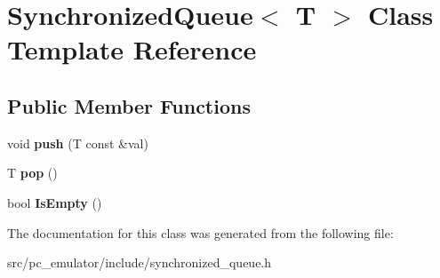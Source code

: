 \hypertarget{classSynchronizedQueue}{}\section{Synchronized\+Queue$<$ T $>$ Class Template Reference}
\label{classSynchronizedQueue}
\subsection*{Public Member Functions}
\begin{DoxyCompactItemize}
\item 
void {\bfseries push} (T const \&val)\hypertarget{classSynchronizedQueue_a69cb7995262bfe4483d923ed272a2476}{}\label{classSynchronizedQueue_a69cb7995262bfe4483d923ed272a2476}

\item 
T {\bfseries pop} ()\hypertarget{classSynchronizedQueue_a0ea5f654a1a6877938a5629922b7241b}{}\label{classSynchronizedQueue_a0ea5f654a1a6877938a5629922b7241b}

\item 
bool {\bfseries Is\+Empty} ()\hypertarget{classSynchronizedQueue_a2d5dc8f1a5aabf0cea13750318a7abba}{}\label{classSynchronizedQueue_a2d5dc8f1a5aabf0cea13750318a7abba}

\end{DoxyCompactItemize}


The documentation for this class was generated from the following file\+:\begin{DoxyCompactItemize}
\item 
src/pc\+\_\+emulator/include/synchronized\+\_\+queue.\+h\end{DoxyCompactItemize}
